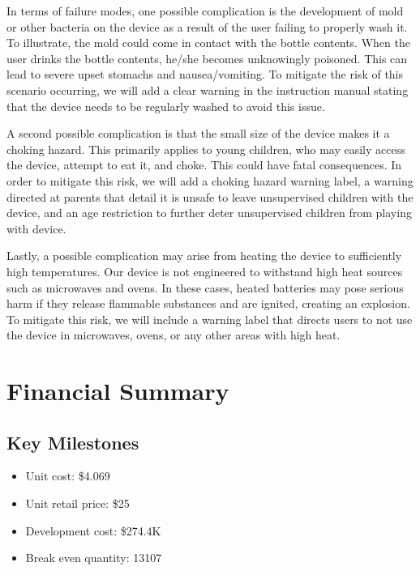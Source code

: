 \documentclass[12pt]{article}
\begin{document}
	In terms of failure modes, one possible complication is the development of mold or other bacteria on the device as a result of the user failing to properly wash it. To illustrate, the mold could come in contact with the bottle contents. When the user drinks the bottle contents, he/she becomes unknowingly poisoned. This can lead to severe upset stomachs and nausea/vomiting. To mitigate the risk of this scenario occurring, we will add a clear warning in the instruction manual stating that the device needs to be regularly washed to avoid this issue. 
	
	A second possible complication is that the small size of the device makes it a choking hazard. This primarily applies to young children, who may easily access the device, attempt to eat it, and choke. This could have fatal consequences. In order to mitigate this risk, we will add a choking hazard warning label, a warning directed at parents that detail it is unsafe to leave unsupervised children with the device, and an age restriction to further deter unsupervised children from playing with device.
	
	Lastly, a possible complication may arise from heating the device to sufficiently high temperatures. Our device is not engineered to withstand high heat sources such as microwaves and ovens. In these cases, heated batteries may pose serious harm if they release flammable substances and are ignited, creating an explosion. To mitigate this risk, we will include a warning label that directs users to not use the device in microwaves, ovens, or any other areas with high heat.
	
	
	
	
	\section*{Financial Summary}
	\subsection*{Key Milestones}
	\begin{itemize}
		\item 	Unit cost: \$4.069
		\item Unit retail price: \$25
		\item Development cost: \$274.4K
		\item Break even quantity: 13107
	\end{itemize}
\end{document}
